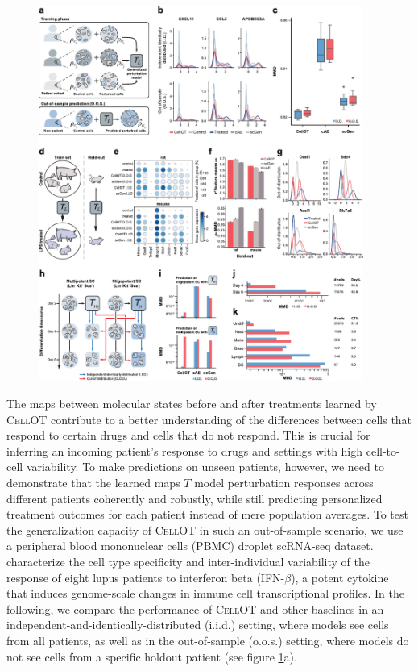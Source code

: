 \begin{figure}
  \begin{center}
    \includegraphics[width=0.95\textwidth]{figures/cellot-methods/Bunne_Main_Fig4.pdf}
  \end{center}
  \caption{}\label{fig:cellot-main-ood}
\end{figure}


The maps between molecular states before and after treatments learned by \textsc{CellOT} contribute to a better understanding of the differences between cells that respond to certain drugs and cells that do not respond. This is crucial for inferring an incoming patient's response to drugs and settings with high cell-to-cell variability.
To make predictions on unseen patients, however, we need to demonstrate that the learned maps $T$ model perturbation responses across different patients coherently and robustly, while still predicting personalized treatment outcomes for each patient instead of mere population averages.
To test the generalization capacity of \textsc{CellOT} in such an out-of-sample scenario, we use a peripheral blood mononuclear cells (PBMC) droplet scRNA-seq dataset. \citet{kang2018multiplexed} characterize the cell type specificity and inter-individual variability of the response of eight lupus patients to interferon beta (IFN-$\beta$), a potent cytokine that induces genome-scale changes in immune cell transcriptional profiles.
In the following, we compare the performance of \textsc{CellOT} and other baselines in an independent-and-identically-distributed (i.i.d.) setting, where models see cells from all patients, as well as in the out-of-sample (o.o.s.) setting, where models do not see cells from a specific holdout patient (see figure \ref{fig:cellot-main-ood}a).


